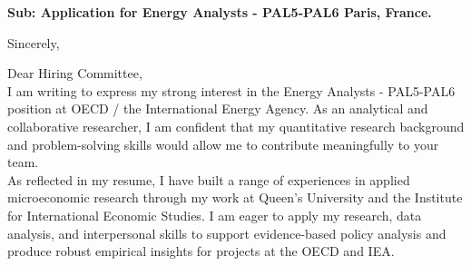 \documentclass[11pt,a4paper,roman]{moderncv}
\begin{document}
\date{\today}
\opening{\textbf{Sub: Application for Energy Analysts - PAL5-PAL6 Paris, France.}}
\closing{Sincerely, \vspace{-1em}}


\makelettertitle



Dear Hiring Committee,
\\
\vspace{1em}
I am writing to express my strong interest in the Energy Analysts - PAL5-PAL6 position at OECD / the International Energy Agency. As an analytical and collaborative researcher, I am confident that my quantitative research background and problem-solving skills would allow me to contribute meaningfully to your team.\\

\vspace{1em}
As reflected in my resume, I have built a range of experiences in applied microeconomic research through my work at Queen's University and the Institute for International Economic Studies. I am eager to apply my research, data analysis, and interpersonal skills to support evidence-based policy analysis and produce robust empirical insights for projects at the OECD and IEA.\\
\vspace{1em}
\end{document}
